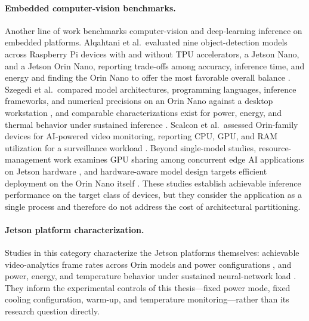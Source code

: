 \paragraph{Embedded computer-vision benchmarks.}
Another line of work benchmarks computer-vision and deep-learning
inference on embedded platforms. Alqahtani et al.\ evaluated nine
object-detection models across Raspberry Pi devices with and without TPU
accelerators, a Jetson Nano, and a Jetson Orin Nano, reporting trade-offs
among accuracy, inference time, and energy and finding the Orin Nano to
offer the most favorable overall balance \cite{alqahtani2026}. Szegedi
et al.\ compared model architectures, programming languages, inference
frameworks, and numerical precisions on an Orin Nano against a desktop
workstation \cite{szegedi2026}, and comparable characterizations exist for
power, energy, and thermal behavior under sustained inference
\cite{zequn2026}. Scalcon et al.\ assessed Orin-family devices for
AI-powered video monitoring, reporting CPU, GPU, and RAM utilization for a
surveillance workload \cite{scalcon2024}. Beyond single-model studies,
resource-management work examines GPU sharing among concurrent edge AI
applications on Jetson hardware \cite{woo2025}, and hardware-aware model
design targets efficient deployment on the Orin Nano itself
\cite{aalishah2025}. These studies establish achievable inference
performance on the target class of devices, but they consider the
application as a single process and therefore do not address the cost of
architectural partitioning.

\paragraph{Jetson platform characterization.}
Studies in this category characterize the Jetson platforms themselves:
achievable video-analytics frame rates across Orin models and power
configurations \cite{scalcon2024}, and power, energy, and temperature
behavior under sustained neural-network load \cite{zequn2026}. They
inform the experimental controls of this thesis---fixed power mode,
fixed cooling configuration, warm-up, and temperature
monitoring---rather than its research question directly.

